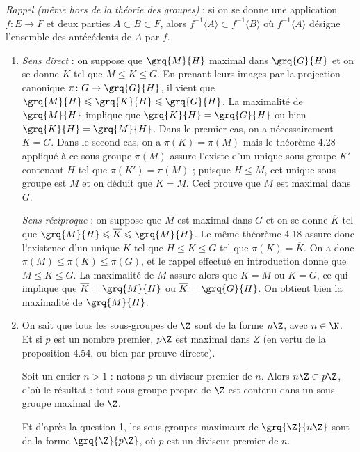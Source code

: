 \emph{Rappel (même hors de la théorie des groupes)} : si on se donne une application $f\colon E\to F$ et deux parties $A\subset B\subset F$, alors $f^{-1} \langle A\rangle \subset f^{-1} \langle B\rangle$ où
$f^{-1} \langle A\rangle$ désigne l'ensemble des antécédents de $A$ par $f$.

\begin{enumerate}
\item \emph{Sens direct} : on suppose que $\grq{M}{H}$ maximal dans $\grq{G}{H}$ et on se donne $K$ tel que $M\leqslant K\leqslant G$. En prenant leurs images par la projection canonique $\pi\colon G\to \grq{G}{H}$, 
il vient que $\grq{M}{H} \leqslant \grq{K}{H} \leqslant \grq{G}{H}$. La maximalité de $\grq{M}{H}$ implique que $ \grq{K}{H}=  \grq{G}{H}$ ou bien $ \grq{K}{H} =  \grq{M}{H}$. Dans le premier cas, 
on a nécessairement $K=G$. Dans le second cas, on a $\pi(K) = \pi(M)$ mais le théorème 4.28 appliqué à ce sous-groupe $ \pi(M)$ assure l'existe d'un unique sous-groupe $K'$ contenant $H$ tel que $\pi(K') = \pi(M)$ ; puisque 
$H\leqslant M$, cet unique sous-groupe est $M$ et on déduit que $K=M$. Ceci prouve que $M$ est maximal dans $G$.

\emph{Sens réciproque} : on suppose que $M$ est maximal dans $G$ et on se donne $\overline{K}$ tel que $\grq{M}{H} \leqslant \overline{K} \leqslant \grq{M}{H}$. Le même théorème 4.18 assure donc
l'existence d'un unique $K$ tel que $H\leqslant K\leqslant G$ tel que $\pi(K) =  \overline{K}$. On a donc $\pi(M) \leqslant \pi(K) \leqslant \pi(G)$, et le rappel effectué en introduction 
donne que $M \leqslant K \leqslant G$. La maximalité de $M$ assure alors que $K=M$ ou $K=G$, ce qui implique que $\overline{K} = \grq{M}{H}$ ou $\overline{K} = \grq{G}{H}$. On obtient bien la maximalité de $\grq{M}{H}$.

\item On sait que tous les sous-groupes de $\Z$ sont de la forme $n\Z$, avec $n\in \N$. Et si $p$ est un nombre premier, $p\Z$ est maximal dans $Z$ (en vertu de la proposition 4.54, ou bien par preuve directe).

Soit un entier $n>1$ : notons $p$ un diviseur premier de $n$. Alors $n\Z \subset p\Z$, d'où le résultat : tout sous-groupe propre de $\Z$ est contenu dans un sous-groupe maximal de $\Z$.

Et d'après la question 1, les sous-groupes maximaux de $\grq{\Z}{n\Z}$ sont de la forme $\grq{\Z}{p\Z}$, où $p$ est un diviseur premier de $n$.


\end{enumerate}
